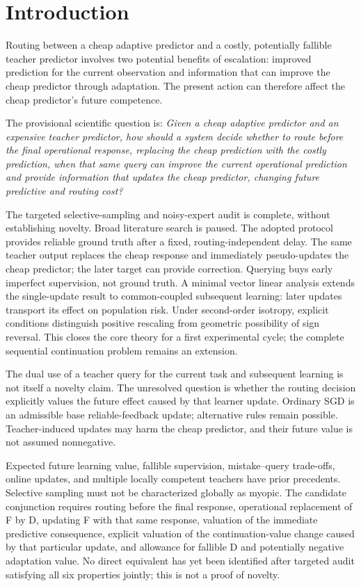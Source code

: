\section{Introduction}

Routing between a cheap adaptive predictor and a costly, potentially fallible
teacher predictor involves two potential benefits of escalation: improved
prediction for the current observation and information that can improve the
cheap predictor through adaptation. The present action can therefore affect
the cheap predictor's future competence.

The provisional scientific question is: \emph{Given a cheap adaptive predictor
and an expensive teacher predictor, how should a system decide whether to
route before the final operational response, replacing the cheap prediction
with the costly prediction, when that same query can improve the current
operational prediction and provide information that updates the cheap
predictor, changing future predictive and routing cost?}

The targeted selective-sampling and noisy-expert audit is complete, without
establishing novelty. Broad literature search is paused. The adopted protocol provides reliable
ground truth after a fixed, routing-independent delay. The same teacher
output replaces the cheap response and immediately pseudo-updates the cheap
predictor; the later target can provide correction. Querying buys early
imperfect supervision, not ground truth. A minimal vector linear analysis
extends the single-update result to common-coupled subsequent learning:
later updates transport its effect on population risk. Under second-order
isotropy, explicit conditions distinguish positive rescaling from geometric
possibility of sign reversal. This closes the core theory for a first
experimental cycle; the complete sequential continuation problem remains
an extension.

The dual use of a teacher query for the current task and subsequent learning
is not itself a novelty claim. The unresolved question is whether the routing
decision explicitly values the future effect caused by that learner update.
Ordinary SGD is an admissible base reliable-feedback update; alternative
rules remain possible. Teacher-induced updates may harm the cheap
predictor, and their future value is not assumed nonnegative.

Expected future learning value, fallible supervision, mistake--query
trade-offs, online updates, and multiple locally competent teachers have
prior precedents. Selective sampling must not be characterized globally as
myopic. The candidate conjunction requires routing before the final response,
operational replacement of F by D, updating F with that same response,
valuation of the immediate predictive consequence, explicit valuation of the
continuation-value change caused by that particular update, and allowance
for fallible D and potentially negative adaptation value. No direct equivalent
has yet been identified after targeted audit satisfying all six properties
jointly; this is not a proof of novelty.
